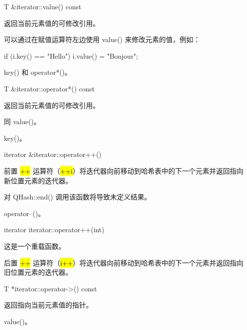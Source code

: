 T \&iterator::value() const

返回当前元素值的可修改引用。

可以通过在赋值运算符左边使用 value() 来修改元素的值，例如：

\begin{cppcode}
if (i.key() == "Hello")
    i.value() = "Bonjour";
\end{cppcode}


\begin{seeAlso}
key() 和 operator*()。
\end{seeAlso}

T \&iterator::operator*() const

返回当前元素值的可修改引用。

同 value()。


\begin{seeAlso}
key()。
\end{seeAlso}


iterator \&iterator::operator++()

前置 \hl{++} 运算符（\hl{++i}）将迭代器向前移动到哈希表中的下一个元素并返回指向新位置元素的迭代器。

对 QHash::end() 调用该函数将导致未定义结果。


\begin{seeAlso}
operator--()。
\end{seeAlso}

iterator iterator::operator++(int)

这是一个重载函数。

后置 \hl{++} 运算符（\hl{i++}）将迭代器向前移动到哈希表中的下一个元素并返回指向旧位置元素的迭代器。

T *iterator::operator->() const

返回指向当前元素值的指针。

\begin{seeAlso}
 value()。
\end{seeAlso}
